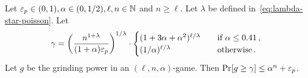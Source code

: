   \begin{lemma}\label{lemma:xor-game-poisson-gamma}
      Let $\mathsf{\varepsilon}_p \in (0, 1), \alpha \in (0, 1/2), \ell, n \in \mathbb{N}$ and $n \geq \ell$. 
      Let $\lambda$ be defined in~\eqref{eq:lambda-star-poisson}.
      Let 
      \begin{equation}
          \label{eq:xor-poisson-tail-gamma}
          \gamma = \left(\frac{n^{1 + \lambda} }{ (1+\alpha) \mathsf{\varepsilon}_p} \right)^{1/\lambda}
              \cdot \begin{cases}
                  (1 + 3 \alpha + \alpha^2)^{\ell/\lambda} &\quad\text{if $\alpha \leq 0.41$\,,} \\
                  (1/\alpha)^{\ell/\lambda} &\quad\text{otherwise\,.}
              \end{cases}
      \end{equation}
      Let $g$ be the grinding power in an $(\ell, n, \alpha)$-game. 
      Then $\Pr[g \geq \gamma] \leq \alpha^n + \mathsf{\varepsilon}_p$.
  \end{lemma}
